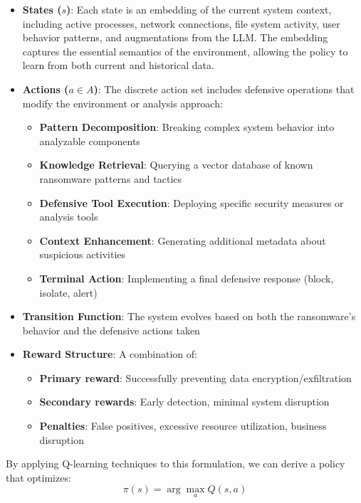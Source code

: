 \documentclass[11pt]{article}
\begin{document}
\begin{itemize}
    \item \textbf{States ($s$)}: Each state is an embedding of the current system context, including active processes, network connections, file system activity, user behavior patterns, and augmentations from the LLM. The embedding captures the essential semantics of the environment, allowing the policy to learn from both current and historical data.
    
    \item \textbf{Actions ($a \in A$)}: The discrete action set includes defensive operations that modify the environment or analysis approach:
    \begin{itemize}
        \item \textbf{Pattern Decomposition}: Breaking complex system behavior into analyzable components
        \item \textbf{Knowledge Retrieval}: Querying a vector database of known ransomware patterns and tactics
        \item \textbf{Defensive Tool Execution}: Deploying specific security measures or analysis tools
        \item \textbf{Context Enhancement}: Generating additional metadata about suspicious activities
        \item \textbf{Terminal Action}: Implementing a final defensive response (block, isolate, alert)
    \end{itemize}
    
    \item \textbf{Transition Function}: The system evolves based on both the ransomware's behavior and the defensive actions taken
    
    \item \textbf{Reward Structure}: A combination of:
    \begin{itemize}
        \item \textbf{Primary reward}: Successfully preventing data encryption/exfiltration
        \item \textbf{Secondary rewards}: Early detection, minimal system disruption
        \item \textbf{Penalties}: False positives, excessive resource utilization, business disruption
    \end{itemize}
\end{itemize}

By applying Q-learning techniques to this formulation, we can derive a policy that optimizes:
$$\pi(s) = \arg\max_a Q(s,a)$$
\end{document}
